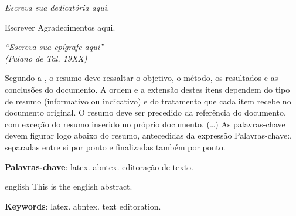 \documentclass[
	12pt,				%
	openright,			%
	twoside,			%
	a4paper,			%
	english,			%
	brazil				%
	]{abntex2}
\begin{document}
\begin{dedicatoria}
   \vspace*{\fill}
   \centering
   \noindent
   \textit{ Escreva sua dedicatória aqui.} \vspace*{\fill}
\end{dedicatoria}

\begin{agradecimentos}
Escrever Agradecimentos aqui.

\end{agradecimentos}

\begin{epigrafe}
    \vspace*{\fill}
	\begin{flushright}
		\textit{``Escreva sua epígrafe aqui''\\
		(Fulano de Tal, 19XX)}
	\end{flushright}
\end{epigrafe}


\setlength{\absparsep}{18pt} %
\begin{resumo}
 Segundo a \cite{NBR6028:2003}, o resumo deve ressaltar o
 objetivo, o método, os resultados e as conclusões do documento. A ordem e a extensão
 destes itens dependem do tipo de resumo (informativo ou indicativo) e do
 tratamento que cada item recebe no documento original. O resumo deve ser
 precedido da referência do documento, com exceção do resumo inserido no
 próprio documento. (\ldots) As palavras-chave devem figurar logo abaixo do
 resumo, antecedidas da expressão Palavras-chave:, separadas entre si por
 ponto e finalizadas também por ponto.

 \textbf{Palavras-chave}: latex. abntex. editoração de texto.
\end{resumo}

\begin{resumo}[Abstract]
 \begin{otherlanguage*}{english}
   This is the english abstract.

   \vspace{\onelineskip}
 
   \noindent 
   \textbf{Keywords}: latex. abntex. text editoration.
 \end{otherlanguage*}
\end{resumo}
\end{document}
